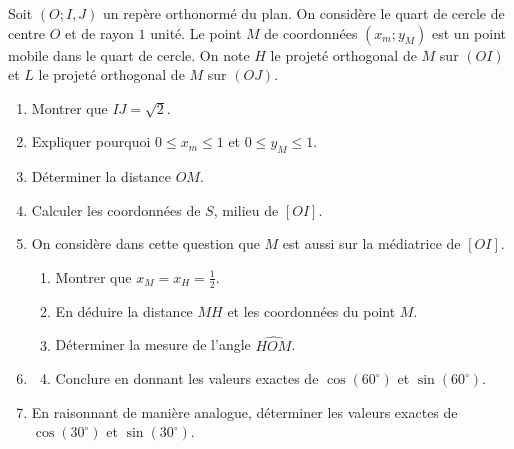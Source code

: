 \documentclass[11pt]{article}
\begin{document}
\begin{exo}
Soit $(O; I, J)$ un repère orthonormé du plan. On
considère le quart de cercle de centre $O$ et de rayon $1$ unité. Le point $M$
de coordonnées $(x_m; y_M)$ est un point mobile dans le quart de cercle. On note
$H$ le projeté orthogonal de $M$ sur $(OI)$ et $L$ le projeté orthogonal de $M$
sur $(OJ)$.
\begin{minipage}[]{.6\textwidth}
\begin{enumerate}
  \item Montrer que $IJ=\sqrt 2$.
  \item Expliquer pourquoi $0\leq x_m\leq 1$ et $0\leq y_M\leq 1$.
  \item Déterminer la distance $OM$.
  \item Calculer les coordonnées de $S$, milieu de $\left[ OI \right]$.
  \item On considère dans cette question que $M$ est aussi sur la médiatrice de
    $\left[ OI \right]$.
    \begin{enumerate}
      \item Montrer que $x_M=x_H=\frac{1}{2}$.
      \item En déduire la distance $MH$ et les coordonnées du point $M$.
      \item Déterminer la mesure de l'angle $\widehat{HOM}$.
    \end{enumerate}
\end{enumerate}
\end{minipage}
\begin{minipage}[]{.4\textwidth}
  \begin{center}
  \end{center}
\end{minipage}
\begin{enumerate}
    \setcounter{enumi}{5}
  \item[]
    \begin{enumerate}
        \setcounter{enumii}{3}
      \item Conclure en donnant les valeurs exactes de $\cos(60^\circ)$ et
        $\sin(60^\circ)$.
    \end{enumerate}
  \item En raisonnant de manière analogue, déterminer les valeurs exactes de
    $\cos(30^\circ)$ et $\sin(30^\circ)$.
\end{enumerate}
\end{exo}
\end{document}
